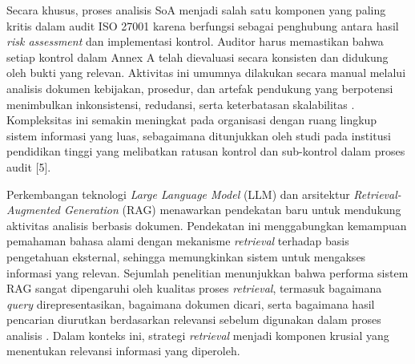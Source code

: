 Secara khusus, proses analisis SoA menjadi salah satu komponen yang paling kritis dalam audit ISO 27001 karena berfungsi sebagai penghubung antara hasil \textit{risk assessment} dan implementasi kontrol. Auditor harus memastikan bahwa setiap kontrol dalam Annex A telah dievaluasi secara konsisten dan didukung oleh bukti yang relevan. Aktivitas ini umumnya dilakukan secara manual melalui analisis dokumen kebijakan, prosedur, dan artefak pendukung yang berpotensi menimbulkan inkonsistensi, redudansi, serta keterbatasan skalabilitas \cite{csam2024}. Kompleksitas ini semakin meningkat pada organisasi dengan ruang lingkup sistem informasi yang luas, sebagaimana ditunjukkan oleh studi pada institusi pendidikan tinggi yang melibatkan ratusan kontrol dan sub-kontrol dalam proses audit [5].

Perkembangan teknologi \textit{Large Language Model} (LLM) dan arsitektur \textit{Retrieval-Augmented Generation} (RAG) menawarkan pendekatan baru untuk mendukung aktivitas analisis berbasis dokumen. Pendekatan ini menggabungkan kemampuan pemahaman bahasa alami dengan mekanisme \textit{retrieval} terhadap basis pengetahuan eksternal, sehingga memungkinkan sistem untuk mengakses informasi yang relevan. Sejumlah penelitian menunjukkan bahwa performa sistem RAG sangat dipengaruhi oleh kualitas proses \textit{retrieval}, termasuk bagaimana \textit{query} direpresentasikan, bagaimana dokumen dicari, serta bagaimana hasil pencarian diurutkan berdasarkan relevansi sebelum digunakan dalam proses analisis \cite{gupta2025compliance,lajbr2025,auditgpt2025,reguquery2025}. Dalam konteks ini, strategi \textit{retrieval} menjadi komponen krusial yang menentukan relevansi informasi yang diperoleh.

